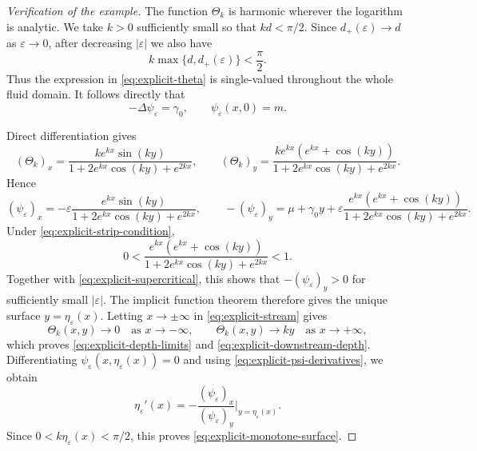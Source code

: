\documentclass[12pt,letterpaper]{amsart}
\numberwithin{equation}{section}
\begin{document}
	\begin{proof}[{Verification of the example}]
{The function $\Theta_k$ is harmonic wherever the logarithm is}
		analytic.  We take $k>0$ sufficiently small so that $kd<\pi/2$.
		Since $d_+(\varepsilon)\to d$ as $\varepsilon\to0$, after decreasing
		$|\varepsilon|$ we also have
		\begin{equation}\label{eq:explicit-strip-condition}
			k\max\{d,d_+(\varepsilon)\}<\frac{\pi}{2}.
		\end{equation}
		Thus the expression in \eqref{eq:explicit-theta} is single-valued throughout
		the whole fluid domain.  It follows directly that
		\begin{equation*}
			-\Delta\psi_\varepsilon=\gamma_0,
			\qquad
			\psi_\varepsilon(x,0)=m.
		\end{equation*}
	
		Direct differentiation gives
		\begin{equation}\label{eq:explicit-theta-derivatives}
			(\Theta_k)_x=\frac{ke^{kx}\sin(ky)}{1+2e^{kx}\cos(ky)+e^{2kx}},
			\qquad
			(\Theta_k)_y=\frac{ke^{kx}(e^{kx}+\cos(ky))}{1+2e^{kx}\cos(ky)+e^{2kx}}.
		\end{equation}
		Hence
		\begin{equation}\label{eq:explicit-psi-derivatives}
			(\psi_\varepsilon)_x
			=-\varepsilon\frac{e^{kx}\sin(ky)}{1+2e^{kx}\cos(ky)+e^{2kx}},
			\qquad
			-(\psi_\varepsilon)_y
			=\mu+\gamma_0y
			+\varepsilon\frac{e^{kx}(e^{kx}+\cos(ky))}{1+2e^{kx}\cos(ky)+e^{2kx}}.
		\end{equation}
		Under \eqref{eq:explicit-strip-condition},
		\begin{equation*}
			0<\frac{e^{kx}(e^{kx}+\cos(ky))}{1+2e^{kx}\cos(ky)+e^{2kx}}<1.
		\end{equation*}
		Together with \eqref{eq:explicit-supercritical}, this shows that
		$-(\psi_\varepsilon)_y>0$ for sufficiently small
		$|\varepsilon|$.  The implicit function theorem therefore gives the
		unique surface $y=\eta_\varepsilon(x)$.  Letting $x\to\pm\infty$ in
		\eqref{eq:explicit-stream} gives
		\begin{equation*}
			\Theta_k(x,y)\to0\quad\text{as }x\to-\infty,
			\qquad
			\Theta_k(x,y)\to ky\quad\text{as }x\to+\infty,
		\end{equation*}
		which proves \eqref{eq:explicit-depth-limits} and
		\eqref{eq:explicit-downstream-depth}.  Differentiating
		$\psi_\varepsilon(x,\eta_\varepsilon(x))=0$ and using
		\eqref{eq:explicit-psi-derivatives}, we obtain
		\begin{equation*}
			\eta_\varepsilon'(x)
			=-\frac{(\psi_\varepsilon)_x}
			{(\psi_\varepsilon)_y}
			{\bigg|_{y=\eta_\varepsilon(x)}}.
		\end{equation*}
		Since $0<k\eta_\varepsilon(x)<\pi/2$, this proves
		\eqref{eq:explicit-monotone-surface}.
		

\end{proof}
\end{document}

